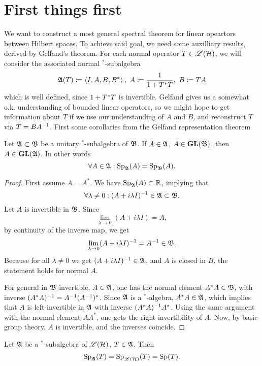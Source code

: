 
\section{First things first}
We want to construct a most general spectral theorem for linear opeartors between Hilbert spaces. To achieve said goal, we need some auxilliary results, derived by Gelfand's theorem. For each normal operator $T \in \mathscr{L}(\mathcal{H})$, we will consider the associated normal $^*$-subalgebra 
\[
 \mathfrak{A}(T) \coloneqq \left\langle I, A, B, B^* \right\rangle,~ A \coloneqq \frac{1}{1 + T ^{*} T}, ~ B \coloneqq TA
\]
which is well defined, since $1 + T ^{*} T$ is invertible. Gelfand gives us a somewhat o.k. understanding of bounded linear operators, so we might hope to get information about $T$ if we use our understanding of $A$ and $B$, and reconstruct $T$ via $T = BA^{-1}$.
\newline First some corollaries from the Gelfand representation theorem
\begin{prop} \label{specinvariant}
 Let $\mathfrak{A} \subset \mathfrak{B}$ be a unitary $^*$-subalgebra of $\mathfrak{B}$. If $A \in \mathfrak{A}$, $A \in \operatorname{\mathbf{GL}}(\mathfrak{B})$, then $A \in \operatorname{\mathbf{GL}}(\mathfrak{A})$. In other words 
\[
  \forall A \in \mathfrak{A}: \operatorname{Sp}_{\mathfrak{A}}(A) = \operatorname{Sp}_{\mathfrak{B}}(A).
\]

\end{prop}
\begin{proof}
 First assume $A = A^* $. We have $\operatorname{Sp}_{\mathfrak{A}}(A) \subset \mathbb{R}$, implying that
 \[
  \forall \lambda \neq 0: (A + i \lambda I)^{-1} \in \mathfrak{A} \subset \mathfrak{B}.
 \]
 Let $A$ is invertible in $\mathfrak{B}$. Since 
 \[
  \lim_{\lambda \to 0} (A + i \lambda I) = A,
 \]
 by continuity of the inverse map, we get
 \[
  \lim_{\lambda \to 0} (A + i \lambda I) ^{-1} =A ^{-1} \in \mathfrak{B}.
 \]
Because for all $\lambda \neq 0$ we get $ (A + i \lambda I)^{-1} \in \mathfrak{A}$, and $A$ is closed in $B$, the statement  holds for normal $A$. 

For general in $\mathfrak{B}$ invertible, $A \in \mathfrak{A}$, one has the normal element $A^{*} A \in \mathfrak{B}$, with inverse $(A^{*} A)^{-1} = A^{-1} (A^{-1})^*$. Since $\mathfrak{A}$ is a $^*$-algebra, $A^{*} A \in \mathfrak{A}$, which implies that $A$ is left-invertible in $\mathfrak{A}$ with inverse $(A^{*} A)^{-1} A^*$. Using the same argument with the normal element $AA^*$, one gets the right-invertibility of $A$. Now, by basic group theory, $A$ is invertible, and the inverses coincide.
\end{proof}

\begin{cor}
 Let $\mathfrak{A}$ be a $^*$-subalgebra of $\mathscr{L}(\mathcal{H})$, $T \in \mathfrak{A}$. Then 
\[
 \operatorname{Sp}_{\mathfrak{A}} (T) = \operatorname{Sp}_{\mathscr{L}(\mathcal{H})}(T) = \operatorname{Sp}(T).
\]
\end{cor}

